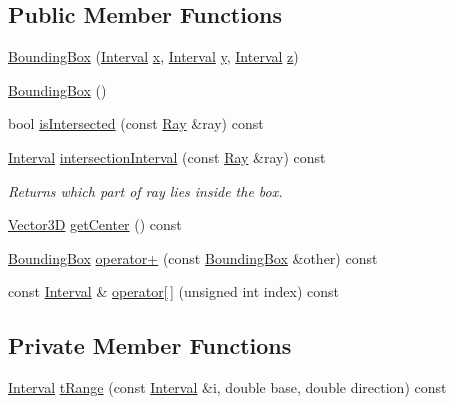\subsection*{Public Member Functions}
\begin{DoxyCompactItemize}
\item 
\hyperlink{classBoundingBox_a4120184a9340ea9a0c43285c9d0f18bf}{Bounding\+Box} (\hyperlink{classInterval}{Interval} \hyperlink{classBoundingBox_a93ea5f12ef2300fe61925f6b44faaebe}{x}, \hyperlink{classInterval}{Interval} \hyperlink{classBoundingBox_a593fd6b66d3ed0352d92024685863090}{y}, \hyperlink{classInterval}{Interval} \hyperlink{classBoundingBox_a9a6005ebe3550447aad804123fa68fea}{z})
\item 
\hyperlink{classBoundingBox_a6e401c4da5839950f1f30c8b8c4d1208}{Bounding\+Box} ()
\item 
bool \hyperlink{classBoundingBox_a84a53ba896c6f97607133c29f1bfd437}{is\+Intersected} (const \hyperlink{classRay}{Ray} \&ray) const 
\item 
\hyperlink{classInterval}{Interval} \hyperlink{classBoundingBox_a0d02545bace7ee780252095caa65b8ec}{intersection\+Interval} (const \hyperlink{classRay}{Ray} \&ray) const 
\begin{DoxyCompactList}\small\item\em Returns which part of ray lies inside the box. \end{DoxyCompactList}\item 
\hyperlink{classVector3D}{Vector3D} \hyperlink{classBoundingBox_ac53a80a384d0b7521d23cffdde09c8a7}{get\+Center} () const 
\item 
\hyperlink{classBoundingBox}{Bounding\+Box} \hyperlink{classBoundingBox_a58ea4f5a93b79953b5f971a7e1cb2e9c}{operator+} (const \hyperlink{classBoundingBox}{Bounding\+Box} \&other) const 
\item 
const \hyperlink{classInterval}{Interval} \& \hyperlink{classBoundingBox_a3db32eae066cb2af88dbe9394b58db9f}{operator\mbox{[}$\,$\mbox{]}} (unsigned int index) const 
\end{DoxyCompactItemize}
\subsection*{Private Member Functions}
\begin{DoxyCompactItemize}
\item 
\hyperlink{classInterval}{Interval} \hyperlink{classBoundingBox_abde1102add193570558c7a8f15c12403}{t\+Range} (const \hyperlink{classInterval}{Interval} \&i, double base, double direction) const 
\end{DoxyCompactItemize}

